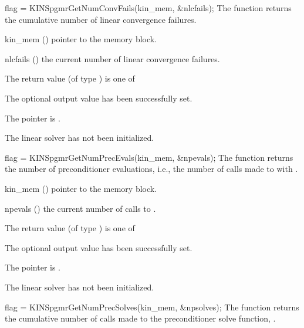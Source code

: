{}
{
  flag = KINSpgmrGetNumConvFails(kin\_mem, \&nlcfails);
}
{
  The function  returns the
  cumulative number of linear convergence failures.
}
{
  \begin{args}
  \item[kin\_mem] ()
    pointer to the {\kinsol} memory block.
  \item[nlcfails] ()
    the current number of linear convergence failures.
  \end{args}
}
{
  The return value  (of type ) is one of
  \begin{args}
  \item[\Id{KINSPGMR\_SUCCESS}] 
    The optional output value has been successfully set.
  \item[\Id{KINSPGMR\_MEM\_NULL}]
    The  pointer is .
  \item[\Id{KINSPGMR\_LMEM\_NULL}]
    The {\kinspgmr} linear solver has not been initialized.
  \end{args}
}
{}
{
  flag = KINSpgmrGetNumPrecEvals(kin\_mem, \&npevals);
}
{
  The function  returns the
  number of preconditioner evaluations, i.e., the number of 
  calls made to  with .
}
{
  \begin{args}
  \item[kin\_mem] ()
    pointer to the {\kinsol} memory block.
  \item[npevals] ()
    the current number of calls to .
  \end{args}
}
{
  The return value  (of type ) is one of
  \begin{args}
  \item[\Id{KINSPGMR\_SUCCESS}] 
    The optional output value has been successfully set.
  \item[\Id{KINSPGMR\_MEM\_NULL}]
    The  pointer is .
  \item[\Id{KINSPGMR\_LMEM\_NULL}]
    The {\kinspgmr} linear solver has not been initialized.
  \end{args}
}
{}
{
  flag = KINSpgmrGetNumPrecSolves(kin\_mem, \&npsolves);
}
{
  The function  returns the
  cumulative number of calls made to the preconditioner 
  solve function, .
}

